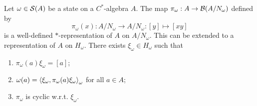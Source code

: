\begin{theorem} \label{GNSconstruction}
Let $\omega\in\operatorname{\mathcal{S}}(A)$ be a state on a $C^*$-algebra $A$. The map $\pi_\omega: A\to \operatorname{\mathcal{B}}(A/N_\omega)$ defined by
\[ \pi_\omega(x) : A/N_\omega \to A/N_\omega: [y] \mapsto [xy] \]
is a well-defined $*$-representation of $A$ on $A/N_\omega$. This can be extended to a representation of $A$ on $H_\omega$. There exists $\xi_\omega\in H_\omega$ such that
\begin{enumerate}
\item $\pi_\omega(a)\xi_\omega = [a]$;
\item $\omega(a) = \inner{\xi_\omega, \pi_\omega(a)\xi_\omega}_\omega$ for all $a\in A$;
\item $\pi_\omega$ is cyclic w.r.t. $\xi_\omega$.
\end{enumerate}
\end{theorem}

